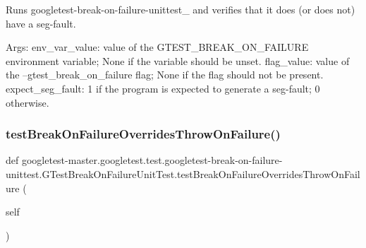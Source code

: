 \begin{DoxyVerb}Runs googletest-break-on-failure-unittest_ and verifies that it does
(or does not) have a seg-fault.

Args:
  env_var_value:    value of the GTEST_BREAK_ON_FAILURE environment
                variable; None if the variable should be unset.
  flag_value:       value of the --gtest_break_on_failure flag;
                None if the flag should not be present.
  expect_seg_fault: 1 if the program is expected to generate a seg-fault;
                0 otherwise.
\end{DoxyVerb}
 \mbox{\label{classgoogletest-master_1_1googletest_1_1test_1_1googletest-break-on-failure-unittest_1_1_g_test_break_on_failure_unit_test_a17c880d861dc923777e34623d385b69b}} 
\subsubsection{\texorpdfstring{testBreakOnFailureOverridesThrowOnFailure()}{testBreakOnFailureOverridesThrowOnFailure()}}
{\footnotesize\ttfamily def googletest-\/master.\+googletest.\+test.\+googletest-\/break-\/on-\/failure-\/unittest.\+G\+Test\+Break\+On\+Failure\+Unit\+Test.\+test\+Break\+On\+Failure\+Overrides\+Throw\+On\+Failure (\begin{DoxyParamCaption}\item[{}]{self }\end{DoxyParamCaption})}

